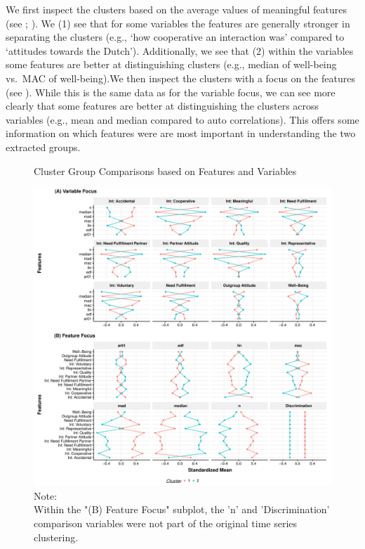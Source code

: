 We first inspect the clusters based on the average values of meaningful
features (see ; \citealp{Kennedy2021}). We
(1) see that for some variables the features are generally stronger in
separating the clusters (e.g., `how cooperative an interaction was'
compared to `attitudes towards the Dutch'). Additionally, we see that
(2) within the variables some features are better at distinguishing
clusters (e.g., median of well-being vs.~MAC of well-being).We then
inspect the clusters with a focus on the features (see
). While this is the same data as for the
variable focus, we can see more clearly that some features are better at
distinguishing the clusters across variables (e.g., mean and median
compared to auto correlations). This offers some information on which
features were are most important in understanding the two extracted
groups.

\begin{figure}[!ht] %
  \caption{Cluster Group Comparisons based on Features and Variables}
  \label{fig:clusterFeatVar}
  \centering\includegraphics[width=\textwidth]{figures/clusterFeatVarComb.pdf}
  \caption*{Note: \\
  Within the "(B) Feature Focus" subplot, the 'n' and 'Discrimination' comparison variables were not part of the original time series clustering.}
\end{figure}

